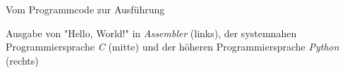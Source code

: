     \begin{frame}{Vom Programmcode zur Ausführung}
    
        \begin{example}
            Ausgabe von "Hello, World!"{} in \alert{\textit{Assembler}} (links), der systemnahen Programmiersprache \alert{\textit{C}} (mitte) und der höheren Programmiersprache \alert{\textit{Python}} (rechts)
        \end{example}
        
        
        \begin{columns}[T]
            \begin{column}{0.3\textwidth}
              Assembler}]{chapters/02_computer_science/code/hello_world.asm}
            \end{column}
            
            \pause
            
            \begin{column}{0.3\textwidth}
              
            \end{column}
            
            \pause
            \begin{column}{0.3\textwidth}
              
            \end{column}
        \end{columns}
        
    \end{frame}
  
